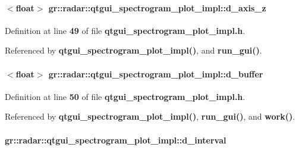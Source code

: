 \paragraph[{d\+\_\+axis\+\_\+z}]{$<$float$>$ gr\+::radar\+::qtgui\+\_\+spectrogram\+\_\+plot\+\_\+impl\+::d\+\_\+axis\+\_\+z}\label{classgr_1_1radar_1_1qtgui__spectrogram__plot__impl_a298625f207c940cfa0f4a3569d2c9abe}


Definition at line {\bf 49} of file {\bf qtgui\+\_\+spectrogram\+\_\+plot\+\_\+impl.\+h}.



Referenced by {\bf qtgui\+\_\+spectrogram\+\_\+plot\+\_\+impl()}, and {\bf run\+\_\+gui()}.

\paragraph[{d\+\_\+buffer}]{$<$float$>$ gr\+::radar\+::qtgui\+\_\+spectrogram\+\_\+plot\+\_\+impl\+::d\+\_\+buffer}\label{classgr_1_1radar_1_1qtgui__spectrogram__plot__impl_a461e0e317e98200e4be2ab671b6c1e20}


Definition at line {\bf 50} of file {\bf qtgui\+\_\+spectrogram\+\_\+plot\+\_\+impl.\+h}.



Referenced by {\bf qtgui\+\_\+spectrogram\+\_\+plot\+\_\+impl()}, {\bf run\+\_\+gui()}, and {\bf work()}.

\paragraph[{d\+\_\+interval}]{ gr\+::radar\+::qtgui\+\_\+spectrogram\+\_\+plot\+\_\+impl\+::d\+\_\+interval}\label{classgr_1_1radar_1_1qtgui__spectrogram__plot__impl_abbc4f0ac38f6d5568cf42aef3ccb8b1d}


